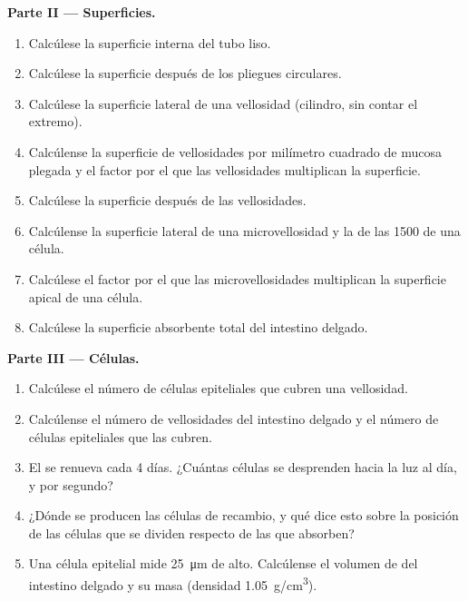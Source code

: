 \begin{problem}
\medskip
\noindent\textbf{Parte II --- Superficies.}
\begin{enumerate}[resume]
  \item Calcúlese la superficie interna del tubo liso.
  \item Calcúlese la superficie después de los pliegues circulares.
  \item Calcúlese la superficie lateral de una vellosidad (cilindro, sin
        contar el extremo).
  \item Calcúlense la superficie de vellosidades por milímetro cuadrado de
        mucosa plegada y el factor por el que las vellosidades multiplican
        la superficie.
  \item Calcúlese la superficie después de las vellosidades.
  \item Calcúlense la superficie lateral de una microvellosidad y la de
        las \qty{1500}{} de una célula.
  \item Calcúlese el factor por el que las microvellosidades multiplican la
        superficie apical de una célula.
  \item Calcúlese la superficie absorbente total del intestino delgado.
\end{enumerate}

\medskip
\noindent\textbf{Parte III --- Células.}
\begin{enumerate}[resume]
  \item Calcúlese el número de células epiteliales que cubren una
        vellosidad.
  \item Calcúlense el número de vellosidades del intestino delgado y el
        número de células epiteliales que las cubren.
  \item El  se renueva cada \qty{4}{} días. ¿Cuántas células se
        desprenden hacia la luz al día, y por segundo?
  \item ¿Dónde se producen las células de recambio, y qué dice esto sobre
        la posición de las células que se dividen respecto de las que
        absorben?
  \item Una célula epitelial mide \qty{25}{\micro m} de alto. Calcúlense
        el volumen de  del intestino delgado y su masa (densidad
        \qty{1.05}{g/cm^3}).
\end{enumerate}


\end{problem}
